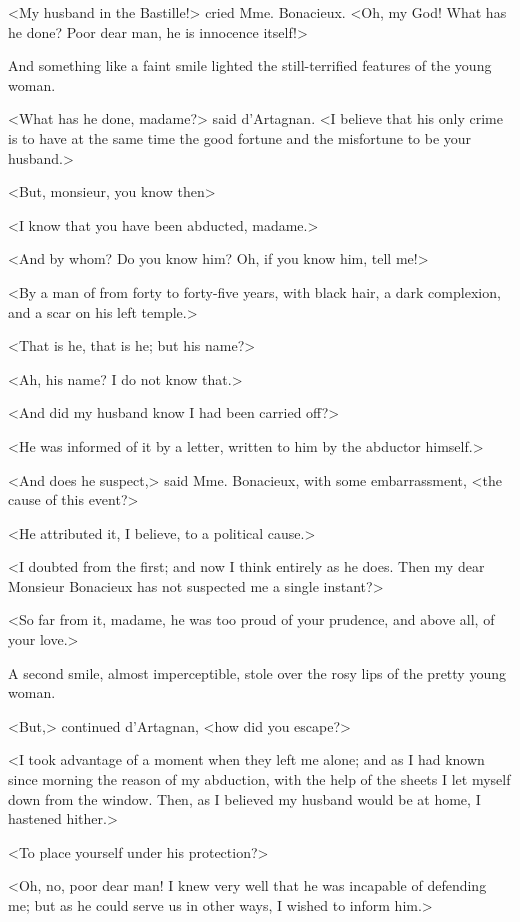<My husband in the Bastille!> cried Mme. Bonacieux. <Oh, my God! What has he done? Poor dear man, he is innocence itself!> 

And something like a faint smile lighted the still-terrified features of the young woman. 

<What has he done, madame?> said d'Artagnan. <I believe that his only crime is to have at the same time the good fortune and the misfortune to be your husband.> 

<But, monsieur, you know then\longdash> 

<I know that you have been abducted, madame.> 

<And by whom? Do you know him? Oh, if you know him, tell me!> 

<By a man of from forty to forty-five years, with black hair, a dark complexion, and a scar on his left temple.> 

<That is he, that is he; but his name?> 

<Ah, his name? I do not know that.> 

<And did my husband know I had been carried off?> 

<He was informed of it by a letter, written to him by the abductor himself.> 

<And does he suspect,> said Mme. Bonacieux, with some embarrassment, <the cause of this event?> 

<He attributed it, I believe, to a political cause.> 

<I doubted from the first; and now I think entirely as he does. Then my dear Monsieur Bonacieux has not suspected me a single instant?> 

<So far from it, madame, he was too proud of your prudence, and above all, of your love.> 

A second smile, almost imperceptible, stole over the rosy lips of the pretty young woman. 

<But,> continued d'Artagnan, <how did you escape?> 

<I took advantage of a moment when they left me alone; and as I had known since morning the reason of my abduction, with the help of the sheets I let myself down from the window. Then, as I believed my husband would be at home, I hastened hither.> 

<To place yourself under his protection?> 

<Oh, no, poor dear man! I knew very well that he was incapable of defending me; but as he could serve us in other ways, I wished to inform him.> 

